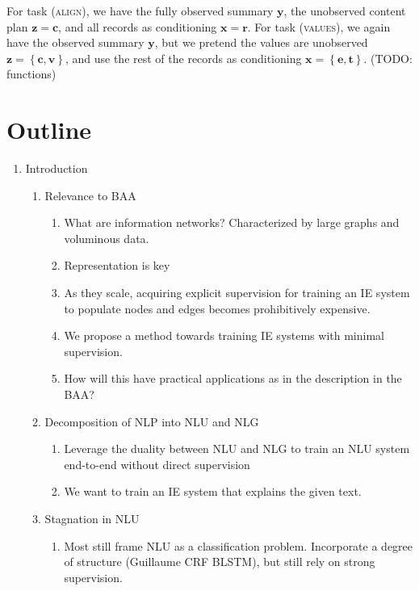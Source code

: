 \documentclass[11pt]{article}
\newcommand\set[1]{\left\{#1\right\}}
\newcommand{\bc}{\mathbf{c}}
\newcommand{\be}{\mathbf{e}}
\newcommand{\br}{\mathbf{r}}
\newcommand{\bt}{\mathbf{t}}
\newcommand{\bv}{\mathbf{v}}
\newcommand{\bx}{\mathbf{x}}
\newcommand{\by}{\mathbf{y}}
\newcommand{\bz}{\mathbf{z}}
\begin{document}
For task (\textsc{align}), we have the fully observed summary $\by$,
the unobserved content plan $\bz=\bc$, and all records as conditioning $\bx=\br$.
For task (\textsc{values}), we again have the observed summary $\by$,
but we pretend the values are unobserved $\bz=\set{\bc,\bv}$, and
use the rest of the records as conditioning $\bx=\set{\be,\bt}$.
(TODO: functions)

\newpage

\section*{Outline}
\begin{enumerate}
\item Introduction
    \begin{enumerate}
    \item Relevance to BAA
        \begin{enumerate}
        \item What are information networks? Characterized by large graphs and voluminous data.
        \item Representation is key
        \item As they scale, acquiring explicit supervision 
            for training an IE system to populate nodes and edges
            becomes prohibitively expensive.
        \item We propose a method towards training IE systems
            with minimal supervision.
        \item How will this have practical applications as in the
            description in the BAA?
        \end{enumerate}
    \item Decomposition of NLP into NLU and NLG
        \begin{enumerate}
        \item Leverage the duality between NLU and NLG
            to train an NLU system end-to-end without direct supervision
        \item We want to train an IE system
            that explains the given text.
        \end{enumerate}
    \item Stagnation in NLU
        \begin{enumerate}
        \item Most still frame NLU as a classification problem.
            Incorporate a degree of structure (Guillaume CRF BLSTM),
            but still rely on strong supervision.
        \end{enumerate}

\end{enumerate}
\end{enumerate}
\end{document}
